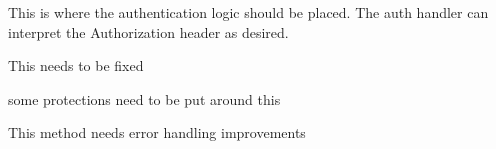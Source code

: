 
\begin{DoxyRefList}
\item[Member \mbox{\hyperlink{classDigTech_1_1REST_1_1SecureResource_a71430566a32cf3a3fe817a5080da71ee}{Dig\+Tech\textbackslash{}REST\textbackslash{}Secure\+Resource\+::is\+Authorized}} ()]\label{todo__todo000004}%
%
This is where the authentication logic should be placed. The auth handler can interpret the Authorization header as desired. 

\label{todo__todo000005}%
%
This needs to be fixed  
\item[Class \mbox{\hyperlink{classDigTechAutoloader}{Dig\+Tech\+Autoloader}} ]\label{todo__todo000002}%
%
some protections need to be put around this  
\item[Member \mbox{\hyperlink{classDigTechAutoloader_ac8dd503a14bf181fbccd3520db3b8466}{Dig\+Tech\+Autoloader\+::loader}} (\$class\+Name)]\label{todo__todo000003}%
%
This method needs error handling improvements 
\end{DoxyRefList}